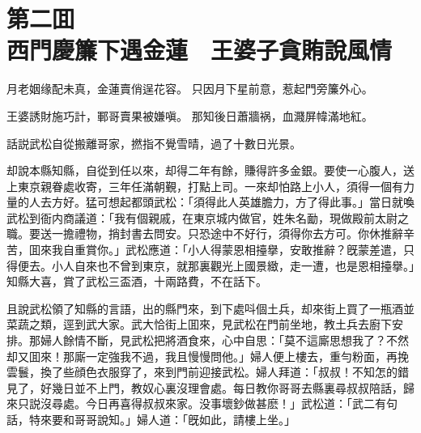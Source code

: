 
\chapter*{第二囬　\\西門慶簾下遇金蓮　王婆子貪賄說風情}


\begin{myquote}
月老姻缘配未真，金蓮賣俏逞花容。
只因月下星前意，惹起門旁簾外心。

王婆誘財施巧計，鄆哥賣果被嫌嗔。
那知後日蕭牆祸，血濺屏幃滿地紅。
\end{myquote}

話説武松自從搬離哥家，撚指不覺雪晴，過了十數日光景。

却說本縣知縣，自從到任以來，却得二年有餘，賺得許多金銀。要使一心腹人，送上東京親眷處收寄，三年任滿朝覲，打點上司。一來却怕路上小人，須得一個有力量的人去方好。猛可想起都頭武松：「須得此人英雄膽力，方了得此事。」當日就喚武松到衙内商議道：「我有個親戚，在東京城内做官，姓朱名勔，現做殿前太尉之職。要送一擔禮物，捎封書去問安。只恐途中不好行，須得你去方可。你休推辭辛苦，囬來我自重賞你。」武松應道：「小人得蒙恩相擡擧，安敢推辭？旣蒙差遣，只得便去。小人自來也不曾到東京，就那裏觀光上國景緻，走一遭，也是恩相擡擧。」知縣大喜，賞了武松三盃酒，十兩路費，不在話下。

且說武松領了知縣的言語，出的縣門來，到下處呌個土兵，却來街上買了一瓶酒並菜蔬之類，逕到武大家。武大恰街上囬來，見武松在門前坐地，教土兵去廚下安排。那婦人餘情不斷，見武松把將酒食來，心中自思：「莫不這廝思想我了？不然却又囬來！那廝一定強我不過，我且慢慢問他。」婦人便上樓去，重勻粉面，再挽雲鬟，換了些顔色衣服穿了，來到門前迎接武松。婦人拜道：「叔叔！不知怎的錯見了，好幾日並不上門，教奴心裏沒理會處。每日教你哥哥去縣裏尋叔叔陪話，歸來只説沒尋處。今日再喜得叔叔來家。没事壞鈔做甚麽！」武松道：「武二有句話，特來要和哥哥說知。」婦人道：「旣如此，請樓上坐。」

